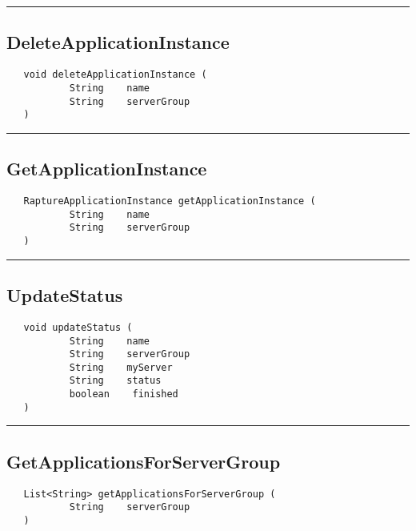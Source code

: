\rule{15cm}{2pt}
\subsection{DeleteApplicationInstance}
\label{Api:DeleteApplicationInstance}
\begin{verbatim}
   void deleteApplicationInstance (
           String    name
           String    serverGroup
   )
\end{verbatim}



\rule{15cm}{2pt}
\subsection{GetApplicationInstance}
\label{Api:GetApplicationInstance}
\begin{verbatim}
   RaptureApplicationInstance getApplicationInstance (
           String    name
           String    serverGroup
   )
\end{verbatim}



\rule{15cm}{2pt}
\subsection{UpdateStatus}
\label{Api:UpdateStatus}
\begin{verbatim}
   void updateStatus (
           String    name
           String    serverGroup
           String    myServer
           String    status
           boolean    finished
   )
\end{verbatim}



\rule{15cm}{2pt}
\subsection{GetApplicationsForServerGroup}
\label{Api:GetApplicationsForServerGroup}
\begin{verbatim}
   List<String> getApplicationsForServerGroup (
           String    serverGroup
   )
\end{verbatim}



